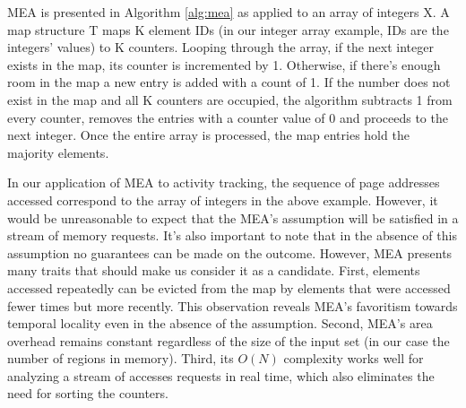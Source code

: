 
MEA is presented in Algorithm \ref{alg:mea} as applied to an array of integers X. A map structure T maps K element IDs (in our integer array example, IDs are the integers' values) to K counters. Looping through the array, if the next integer exists in the map, its counter is incremented by 1. Otherwise, if there's enough room in the map a new entry is added with a count of 1. If the number does not exist in the map and all K counters are occupied, the algorithm subtracts 1 from every counter, removes the entries with a counter value of 0 and proceeds to the next integer. Once the entire array is processed, the map entries hold the majority elements. 


In our application of MEA to activity tracking, the sequence of page addresses accessed correspond to the array of integers in the above example. However, it would be unreasonable to expect that the MEA's assumption will be satisfied in a stream of memory requests. It's also important to note that in the absence of this assumption no guarantees can be made on the outcome. However, MEA presents many traits that should make us consider it as a candidate. First, elements accessed repeatedly can be evicted from the map by elements that were accessed fewer times but more recently. This observation reveals MEA's favoritism towards temporal locality even in the absence of the assumption. Second, MEA's area overhead remains constant regardless of the size of the input set (in our case the number of regions in memory). Third, its $O(N)$ complexity works well for analyzing a stream of accesses requests in real time, which also eliminates the need for sorting the counters.

